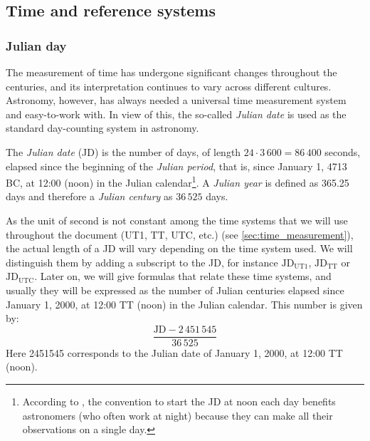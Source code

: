 \documentclass[../main.tex]{subfiles}
\begin{document}
\subsection{Time and reference systems}
\subsubsection{Julian day}\label{sec:julian_day}
The measurement of time has undergone significant changes throughout the centuries, and its interpretation continues to vary across different cultures. Astronomy, however, has always needed a universal time measurement system and easy-to-work with. In view of this, the so-called \emph{Julian date} is used as the standard day-counting system in astronomy.
\begin{definition}
  The \emph{Julian date} (JD) is the number of days, of length $24\cdot3\,600 = 86\,400$ seconds, elapsed since the beginning of the \emph{Julian period}, that is, since January 1, 4713 BC, at 12:00 (noon) in the Julian calendar\footnote{According to \cite{vallado}, the convention to start the JD at noon each day benefits astronomers (who often work at night) because they can make all their observations on a single day.}. A \emph{Julian year} is defined as 365.25 days and therefore a \emph{Julian century} as $36\,525$ days.
\end{definition}
As the unit of second is not constant among the time systems that we will use throughout the document (UT1, TT, UTC, etc.) (see \cref{sec:time_measurement}), the actual length of a JD will vary depending on the time system used. We will distinguish them by adding a subscript to the JD, for instance $\text{JD}_\mathrm{UT1}$, $\text{JD}_\mathrm{TT}$ or $\text{JD}_\mathrm{UTC}$. Later on, we will give formulas that relate these time systems, and usually they will be expressed as the number of Julian centuries elapsed since January 1, 2000, at 12:00 TT (noon) in the Julian calendar. This number is given by:
\begin{equation}
  \frac{\text{JD}-2\,451\,545}{36\,525}
\end{equation}
Here 2451545 corresponds to the Julian date of January 1, 2000, at 12:00 TT (noon).
\end{document}
